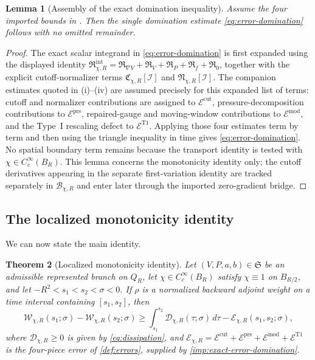 \documentclass[11pt]{amsart}
\numberwithin{equation}{section}
\theoremstyle{plain}
\newtheorem{theorem}{Theorem}[section]
\newtheorem{lemma}[theorem]{Lemma}
\theoremstyle{definition}
\theoremstyle{remark}
\newcommand{\Wloc}{\mathcal W}
\newcommand{\Diss}{\mathcal D}
\newcommand{\Err}{\mathcal E}
\newcommand{\State}{\mathfrak S}
\begin{document}
\begin{lemma}[Assembly of the exact domination inequality]
\label{lem:exact-domination-assembly}
Assume the four imported bounds in .  Then
the single domination estimate \eqref{eq:error-domination} follows with no
omitted remainder.
\end{lemma}

\begin{proof}
The exact scalar integrand in \eqref{eq:error-domination} is first expanded
using the displayed identity
\(\mathfrak R_{\chi,R}^{\mathrm{int}}
=\mathfrak R_{\nabla V}+\mathfrak R_V+\mathfrak R_P+\mathfrak R_f
+\mathfrak R_0\), together with the explicit cutoff-normalizer terms
\(\mathfrak C_{\chi,R}[\mathcal I]\) and
\(\mathfrak N_{\chi,R}[\mathcal I]\).  The companion estimates quoted in
\textup{(i)--(iv)} are assumed precisely for
this expanded list of terms: cutoff and normalizer contributions are assigned
to \(\Err^{\mathrm{cut}}\), pressure-decomposition contributions to
\(\Err^{\mathrm{prs}}\), repaired-gauge and moving-window contributions to
\(\Err^{\mathrm{mod}}\), and the Type~I rescaling defect to
\(\Err^{\mathrm{T1}}\).  Applying those four estimates term by term and then
using the triangle inequality in time gives \eqref{eq:error-domination}.  No
spatial boundary term remains because the transport identity is tested with
\(\chi\in C_c^\infty(B_R)\).  This lemma concerns the monotonicity identity
only; the cutoff derivatives appearing in the separate first-variation
identity are tracked separately in \(\mathcal B_{\chi,R}\) and enter later
through the imported zero-gradient bridge.
\end{proof}

\subsection{The localized monotonicity identity}

We can now state the main identity.

\begin{theorem}[Localized monotonicity identity]
\label{thm:local-monotonicity}
Let \((V,P,a,b)\in\State\) be an admissible represented branch on \(Q_R\),
let \(\chi\in C_c^\infty(B_R)\) satisfy \(\chi\equiv1\) on \(B_{R/2}\), and
let \(-R^2<s_1<s_2<\sigma<0\).  If \(\rho\) is a normalized backward
adjoint weight on a time interval containing \([s_1,s_2]\), then
	\begin{equation}\label{eq:monotonicity}
		\Wloc_{\chi,R}(s_1;\sigma)-\Wloc_{\chi,R}(s_2;\sigma)
		\ge
		\int_{s_1}^{s_2}\Diss_{\chi,R}(\tau;\sigma)\,d\tau
		-\Err_{\chi,R}(s_1,s_2;\sigma),
	\end{equation}
where \(\Diss_{\chi,R}\ge 0\) is given by \eqref{eq:dissipation}, and
	\(\Err_{\chi,R}=\Err^{\mathrm{cut}}+\Err^{\mathrm{prs}}+\Err^{\mathrm{mod}}+\Err^{\mathrm{T1}}\)
is the four-piece error of \cref{def:errors}, supplied by
\cref{imp:exact-error-domination}.
\end{theorem}
\end{document}
